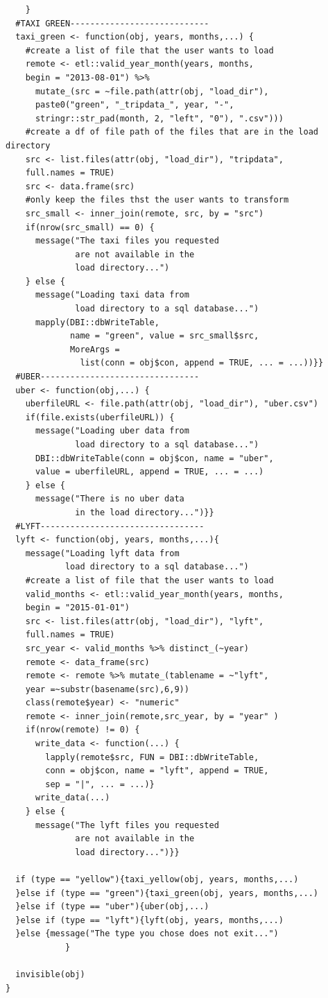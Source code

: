 \documentclass[12pt,twoside]{reedthesis}
\theoremstyle{definition}
\theoremstyle{definition}
\theoremstyle{definition}
\theoremstyle{remark}
\begin{document}
\begin{verbatim}
    }
  #TAXI GREEN----------------------------
  taxi_green <- function(obj, years, months,...) {
    #create a list of file that the user wants to load
    remote <- etl::valid_year_month(years, months, 
    begin = "2013-08-01") %>%
      mutate_(src = ~file.path(attr(obj, "load_dir"), 
      paste0("green", "_tripdata_", year, "-",
      stringr::str_pad(month, 2, "left", "0"), ".csv")))
    #create a df of file path of the files that are in the load directory
    src <- list.files(attr(obj, "load_dir"), "tripdata", 
    full.names = TRUE)
    src <- data.frame(src)
    #only keep the files thst the user wants to transform
    src_small <- inner_join(remote, src, by = "src")
    if(nrow(src_small) == 0) {
      message("The taxi files you requested 
              are not available in the 
              load directory...")
    } else {
      message("Loading taxi data from 
              load directory to a sql database...")
      mapply(DBI::dbWriteTable, 
             name = "green", value = src_small$src, 
             MoreArgs = 
               list(conn = obj$con, append = TRUE, ... = ...))}}
  #UBER--------------------------------
  uber <- function(obj,...) {
    uberfileURL <- file.path(attr(obj, "load_dir"), "uber.csv")
    if(file.exists(uberfileURL)) {
      message("Loading uber data from 
              load directory to a sql database...")
      DBI::dbWriteTable(conn = obj$con, name = "uber", 
      value = uberfileURL, append = TRUE, ... = ...)
    } else {
      message("There is no uber data 
              in the load directory...")}}
  #LYFT---------------------------------
  lyft <- function(obj, years, months,...){
    message("Loading lyft data from 
            load directory to a sql database...")
    #create a list of file that the user wants to load
    valid_months <- etl::valid_year_month(years, months, 
    begin = "2015-01-01")
    src <- list.files(attr(obj, "load_dir"), "lyft", 
    full.names = TRUE)
    src_year <- valid_months %>% distinct_(~year)
    remote <- data_frame(src)
    remote <- remote %>% mutate_(tablename = ~"lyft", 
    year =~substr(basename(src),6,9))
    class(remote$year) <- "numeric"
    remote <- inner_join(remote,src_year, by = "year" )
    if(nrow(remote) != 0) {
      write_data <- function(...) {
        lapply(remote$src, FUN = DBI::dbWriteTable, 
        conn = obj$con, name = "lyft", append = TRUE, 
        sep = "|", ... = ...)}
      write_data(...)
    } else {
      message("The lyft files you requested 
              are not available in the 
              load directory...")}}
  
  if (type == "yellow"){taxi_yellow(obj, years, months,...)
  }else if (type == "green"){taxi_green(obj, years, months,...)
  }else if (type == "uber"){uber(obj,...)
  }else if (type == "lyft"){lyft(obj, years, months,...)
  }else {message("The type you chose does not exit...")
            }
  
  invisible(obj)
}
\end{verbatim}
\end{document}
